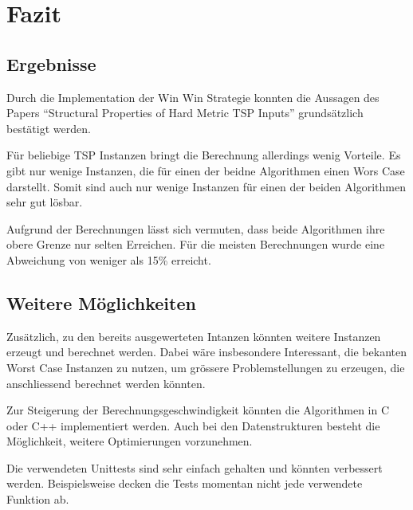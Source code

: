 \documentclass[11pt,a4paper]{article}
\begin{document}
\section{Fazit}
\subsection{Ergebnisse}
Durch die Implementation der Win Win Strategie konnten die Aussagen des Papers "`Structural Properties of Hard Metric TSP Inputs"'\cite{moemke11} grundsätzlich bestätigt werden. 

Für beliebige TSP Instanzen bringt die Berechnung allerdings wenig Vorteile. Es gibt nur wenige Instanzen, die für einen der beidne Algorithmen einen Wors Case darstellt. Somit sind auch nur wenige Instanzen für einen der beiden Algorithmen sehr gut lösbar.

Aufgrund der Berechnungen lässt sich vermuten, dass beide Algorithmen ihre obere Grenze nur selten Erreichen. Für die meisten Berechnungen wurde eine Abweichung von weniger als 15\% erreicht.

\subsection{Weitere Möglichkeiten}
Zusätzlich, zu den bereits ausgewerteten Intanzen könnten weitere Instanzen erzeugt und berechnet werden. Dabei wäre insbesondere Interessant, die bekanten Worst Case Instanzen zu nutzen, um grössere Problemstellungen zu erzeugen, die anschliessend berechnet werden könnten.

Zur Steigerung der Berechnungsgeschwindigkeit könnten die Algorithmen in C oder C++ implementiert werden. Auch bei den Datenstrukturen besteht die Möglichkeit, weitere Optimierungen vorzunehmen.

Die verwendeten Unittests sind sehr einfach gehalten und könnten verbessert werden. Beispielsweise decken die Tests momentan nicht jede verwendete Funktion ab.

\newpage



\end{document}
